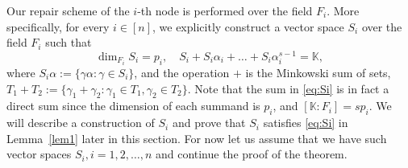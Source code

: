 \documentclass[11pt,onecolumn]{IEEEtran}
\begin{document}
\begin{IEEEproof}
Our repair scheme of the $i$-th node is performed over the field $F_i$. More specifically, for every $i\in[n]$, we explicitly construct a vector space $S_i$ over the field $F_i$ such that
\begin{equation}\label{eq:Si}
\dim_{F_i} S_i = p_i, \quad
  S_i + S_i\alpha_i+\dots + S_i\alpha_i^{s-1}=\mathbb{K},
\end{equation}
where $S_i \alpha := \{\gamma \alpha: \gamma \in S_i\}$,
and the operation $+$ is the Minkowski sum of sets, $T_1 + T_2 := \{\gamma_1+\gamma_2:\gamma_1\in T_1, \gamma_2\in T_2 \}.$ Note that the sum in \eqref{eq:Si} is in fact a direct sum since the dimension of each summand is $p_i$, and $[\mathbb{K}:F_i]=sp_i$.
We will describe a construction of $S_i$ and prove that $S_i$ satisfies \eqref{eq:Si} in Lemma~\ref{lem1} later in this section. For now let us assume that we have such vector spaces $S_i,i=1,2,\dots,n$ and continue the proof of the theorem.


\end{IEEEproof}
\end{document}
